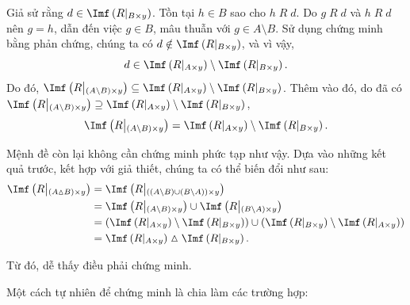 Giả sử rằng $d \in \Imf\left(R\middle|_{B \times y}\right)$. Tồn tại $h \in B$ sao cho $h\;R\;d$. Do $g\;R\;d$ và $h\;R\;d$ nên $g = h$, dẫn đến việc $g \in B$, mâu thuẫn với $g \in A \setminus B$. Sử dụng chứng minh bằng phản chứng, chúng ta có $d \notin \Imf\left(R\middle|_{B \times y}\right)$, và vì vậy, \begin{equation*}
   d \in \Imf\left(R\middle|_{A \times y}\right) \setminus \Imf\left(R\middle|_{B \times y}\right).
\end{equation*}
Do đó, $\Imf\left(R\middle|_{(A \setminus B) \times y}\right) \subseteq \Imf\left(R\middle|_{A \times y}\right) \setminus \Imf\left(R\middle|_{B \times y}\right)$. Thêm vào đó, do đã có $\Imf\left(R\middle|_{(A \setminus B) \times y}\right) \supseteq \Imf\left(R\middle|_{A \times y}\right) \setminus \Imf\left(R\middle|_{B \times y}\right)$, \begin{equation*}
   \Imf\left(R\middle|_{(A \setminus B) \times y}\right) = \Imf\left(R\middle|_{A \times y}\right) \setminus \Imf\left(R\middle|_{B \times y}\right).
\end{equation*}

Mệnh đề còn lại không cần chứng minh phức tạp như vậy. Dựa vào những kết quả trước, kết hợp với giả thiết, chúng ta có thể biến đổi như sau:
\begin{align*}
   \Imf\left(R\middle|_{(A \vartriangle B) \times y}\right) &= \Imf\left(R\middle|_{((A \setminus B) \cup (B \setminus A)) \times y}\right) \\
      &= \Imf\left(R\middle|_{(A \setminus B) \times y}\right) \cup \Imf\left(R\middle|_{(B \setminus A) \times y}\right) \\
      &= \left(\Imf\left(R\middle|_{A \times y}\right) \setminus \Imf\left(R\middle|_{B \times y}\right)\right) \cup \left(\Imf\left(R\middle|_{B \times y}\right) \setminus \Imf\left(R\middle|_{A \times y}\right)\right) \\
      &= \Imf\left(R\middle|_{A \times y}\right) \vartriangle \Imf\left(R\middle|_{B \times y}\right).
\end{align*}

Từ đó, dễ thấy điều phải chứng minh.

\stepSubexercise Một cách tự nhiên để chứng minh là chia làm các trường hợp:

